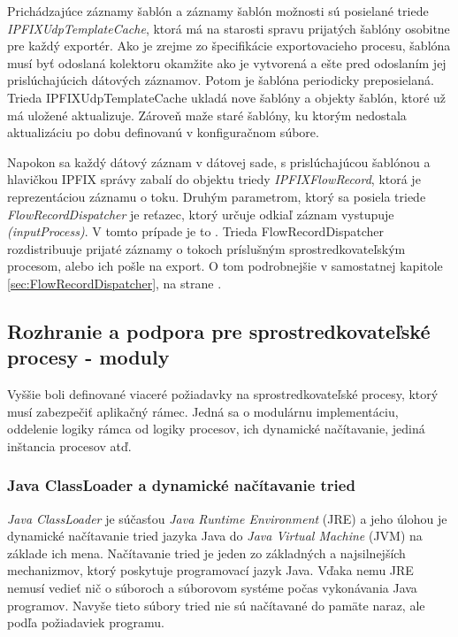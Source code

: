 Prichádzajúce záznamy šablón a záznamy šablón možnosti sú posielané triede 
\emph{IPFIXUdpTemplateCache}, ktorá má na starosti spravu prijatých šablóny osobitne pre každý exportér. 
Ako je zrejme zo špecifikácie exportovacieho procesu, šablóna musí byť odoslaná kolektoru okamžite ako je 
vytvorená a ešte pred odoslaním jej prislúchajúcich dátových záznamov. Potom je šablóna periodicky 
preposielaná. Trieda IPFIXUdpTemplateCache ukladá nove šablóny a objekty šablón, ktoré už má uložené 
aktualizuje. Zároveň maže staré šablóny, ku ktorým nedostala aktualizáciu po dobu definovanú v 
konfiguračnom súbore.

Napokon sa každý dátový záznam v dátovej sade, s prislúchajúcou šablónou a hlavičkou IPFIX správy 
zabalí do objektu triedy \emph{IPFIXFlowRecord}, ktorá je reprezentáciou záznamu o toku. 
Druhým parametrom, ktorý sa posiela triede \emph{FlowRecordDispatcher} je 
reťazec, ktorý určuje odkiaľ záznam vystupuje \emph{(inputProcess)}. V tomto prípade je to 
\emph{}. 
Trieda FlowRecordDispatcher rozdistribuuje prijaté záznamy o tokoch príslušným 
sprostredkovateľským procesom, alebo ich pošle na export. O tom podrobnejšie v samostatnej kapitole
\ref{sec:FlowRecordDispatcher}, na strane \pageref{sec:FlowRecordDispatcher}. 


\subsection{Rozhranie a podpora pre sprostredkovateľské procesy - moduly} \label{sec:intermediate_process}

Vyššie boli definované viaceré požiadavky na sprostredkovateľské procesy, ktorý musí zabezpečiť 
aplikačný rámec. Jedná sa o modulárnu implementáciu, oddelenie logiky rámca od logiky procesov, 
ich dynamické načítavanie, jediná inštancia procesov atď. 

\subsubsection{Java ClassLoader a dynamické načítavanie tried} \label{sec:classLoader}

\emph{Java ClassLoader} je súčasťou \emph{Java Runtime Environment} (JRE) a jeho úlohou je dynamické
načítavanie tried jazyka Java do \emph{Java Virtual Machine} (JVM) na základe ich mena. 
Načítavanie tried je jeden zo základných a najsilnejších mechanizmov, ktorý poskytuje programovací jazyk
Java. Vďaka nemu JRE nemusí vedieť nič o súboroch a súborovom systéme počas vykonávania Java programov. 
Navyše tieto súbory tried nie sú načítavané do pamäte naraz, ale podľa požiadaviek 
programu. \citep{mcmanis, travis}

